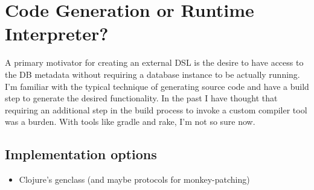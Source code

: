 \documentclass[10pt]{article}
\begin{document}
\section*{Code Generation or Runtime Interpreter?}
A primary motivator for creating an external DSL is the desire to have
access to the DB metadata without requiring a database instance to be
actually running. I'm familiar with the typical technique of
generating source code and have a build step to generate the desired
functionality. In the past I have thought that requiring an additional
step in the build process to invoke a custom compiler tool was a
burden. With tools like gradle and rake, I'm not so sure now.

\subsection*{Implementation options}
\begin{itemize}
  \item Clojure's genclass (and maybe protocols for monkey-patching)
\end{itemize}

   



\end{document}
